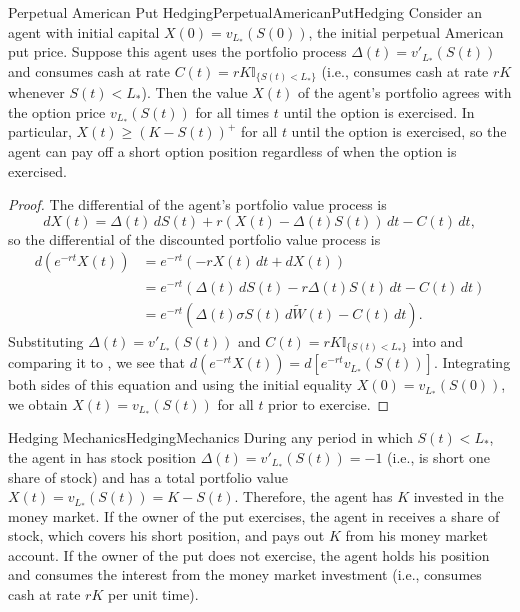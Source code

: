 \begin{cor}{Perpetual American Put Hedging}{PerpetualAmericanPutHedging}
	Consider an agent with initial capital \(X(0) = v_{L_*}(S(0))\), the initial perpetual American put price. Suppose this agent uses the portfolio process \(\Delta(t) = v'_{L_*}(S(t))\) and consumes cash at rate \(C(t) = rK\mathbb{I}_{\{S(t)<L_*\}}\) (i.e., consumes cash at rate \(rK\) whenever \(S(t) < L_*\)). Then the value \(X(t)\) of the agent's portfolio agrees with the option price \(v_{L_*}(S(t))\) for all times \(t\) until the option is exercised. In particular, \(X(t) \ge (K - S(t))^+\) for all \(t\) until the option is exercised, so the agent can pay off a short option position regardless of when the option is exercised.
\end{cor}

\begin{proof}
	The differential of the agent's portfolio value process is
	\[
		dX(t) = \Delta(t) \, dS(t) + r(X(t) - \Delta(t)S(t)) \, dt - C(t) \, dt,
	\]
	so the differential of the discounted portfolio value process is
	\begin{align}
		d(e^{-rt}X(t)) & = e^{-rt}(-rX(t) \, dt + dX(t)) \nonumber                                                                  \\
		               & = e^{-rt}(\Delta(t) \, dS(t) - r\Delta(t)S(t) \, dt - C(t) \, dt) \nonumber                                \\
		               & = e^{-rt}(\Delta(t)\sigma S(t) \, d\widetilde{W}(t) - C(t) \, dt). \label{DiscountedPortfolioDifferential}
	\end{align}
	Substituting \(\Delta(t) = v'_{L_*}(S(t))\) and \(C(t) = rK\mathbb{I}_{\{S(t)<L_*\}}\) into  and comparing it to , we see that \(d(e^{-rt}X(t)) = d[e^{-rt}v_{L_*}(S(t))]\). Integrating both sides of this equation and using the initial equality \(X(0) = v_{L_*}(S(0))\), we obtain \(X(t) = v_{L_*}(S(t))\) for all \(t\) prior to exercise.
\end{proof}

\begin{xtip}{Hedging Mechanics}{HedgingMechanics}
	During any period in which \(S(t) < L_*\), the agent in  has stock position \(\Delta(t) = v'_{L_*}(S(t)) = -1\) (i.e., is short one share of stock) and has a total portfolio value \(X(t) = v_{L_*}(S(t)) = K - S(t)\). Therefore, the agent has \(K\) invested in the money market. If the owner of the put exercises, the agent in  receives a share of stock, which covers his short position, and pays out \(K\) from his money market account. If the owner of the put does not exercise, the agent holds his position and consumes the interest from the money market investment (i.e., consumes cash at rate \(rK\) per unit time).
\end{xtip}

